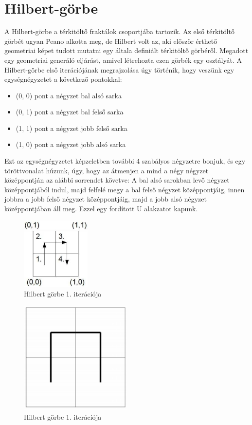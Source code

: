 \section*{Hilbert-görbe}
A Hilbert-görbe a térkitöltő fraktálok csoportjába tartozik. Az első térkitöltő görbét ugyan Peano alkotta meg, de Hilbert volt az, aki először érthető geometriai képet tudott mutatni egy általa definiált térkitöltő görbéről. Megadott egy geometriai generáló eljárást, amivel létrehozta ezen görbék egy osztályát. \cite{hilbert-wiki} A Hilbert-görbe első iterációjának megrajzolása úgy történik, hogy veszünk egy egységnégyzetet a következő pontokkal:
\begin{itemize}
	\item (0, 0) pont a négyzet bal alsó sarka
	\item (0, 1) pont a négyzet bal felső sarka
	\item (1, 1) pont a négyzet jobb felső sarka
	\item (1, 0) pont a négyzet jobb alsó sarka
\end{itemize}
Ezt az egységnégyzetet képzeletben további 4 szabályos négyzetre bonjuk, és egy töröttvonalat húzunk, úgy, hogy az átmenjen a mind a négy négyzet középpontján az alábbi sorrendet követve: A bal alsó sarokban levő négyzet középpontjából indul, majd felfelé megy a bal felső négyzet középpontjáig, innen jobbra a jobb felső négyzet középpontjáig, majd a jobb alsó négyzet középpontjában áll meg. Ezzel egy fordított U alakzatot kapunk. 
\begin{figure}[!ht]
	\begin{center}
		\includegraphics{img/HilbertCurve1-1}
		\caption[labelInTOC]{Hilbert görbe 1. iterációja}
	\end{center}
\end{figure}
\begin{figure}[!ht]
	\begin{center}
		\includegraphics[width=0.5\textwidth]{img/HilbertCurve1-2}
		\caption[labelInTOC]{Hilbert görbe 1. iterációja}
	\end{center}
\end{figure}
